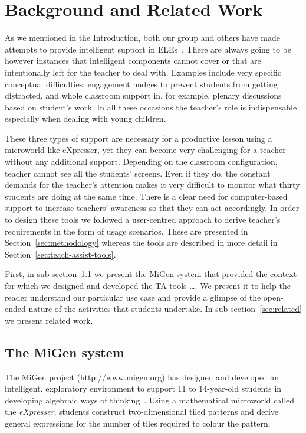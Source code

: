 
\section{Background and Related Work}
\label{sec:backgr-relat-work}

As we mentioned in the Introduction, both our group and others have
made attempts to provide intelligent support in
ELEs~\cite{MiGen-JRPIT,veermans03,AmersiConati09}. There are always
going to be however instances that intelligent components cannot 
cover or that are intentionally left for the teacher to deal
with. Examples include very specific conceptual difficulties, 
engagement nudges to prevent students from getting distracted, 
and whole classroom support in, for example, plenary discussions based 
on student's work. In all these occasions the teacher's role is
 indispensable especially when dealing with young children. 

These three types of support are necessary for a productive lesson
using a microworld like eXpresser, yet they can become very
challenging for a teacher without any additional support. Depending on
the classroom configuration, teacher cannot see all the students'
screens. Even if they do, the constant demands for the teacher's attention
makes it very difficult to monitor what thirty students are doing at
the same time. There is a clear need for computer-based support to
increase teachers' awareness so that they can act accordingly. In
order to design these tools we followed a user-centred approach to
derive teacher's requirements in the form of usage scenarios. These
are presented in Section~\ref{sec:methodology} whereas the tools are
described in more detail in Section~\ref{sec:teach-assist-tools}. 

First, in sub-section~\ref{sec:migen-system} we present the MiGen
system that provided the context for which we designed and developed 
the TA tools \dots. We present it to help the reader understand our
 particular use case and provide a glimpse of the open-ended nature 
of the activities that students undertake.  In sub-section~\ref{sec:related}
we present related work.

\subsection{The MiGen system}
\label{sec:migen-system}

The MiGen project (http://www.migen.org) has designed and developed an
intelligent, exploratory environment to support 11 to 14-year-old
students in developing algebraic ways of
thinking~\cite{Manolis2012Sowing}.
 Using a mathematical microworld called the {\em eXpresser}, students construct
two-dimensional tiled patterns and derive general expressions for the number
of tiles required to colour the pattern. 

